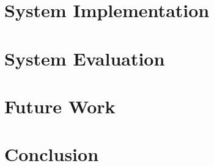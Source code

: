 \documentclass[12pt]{article}
\begin{document}
\section{System Implementation}\label{section4}


\section{System Evaluation}\label{section5}



\section{Future Work}\label{section6}


\section{Conclusion}\label{section7}






%


\pagebreak

\end{document}
